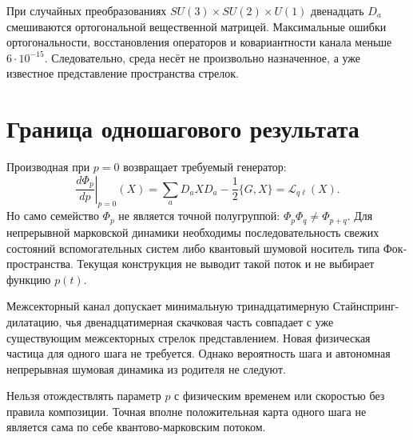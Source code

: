 При случайных преобразованиях $SU(3)\times SU(2)\times U(1)$ двенадцать
$D_a$ смешиваются ортогональной вещественной матрицей. Максимальные ошибки
ортогональности, восстановления операторов и ковариантности канала меньше
$6\cdot10^{-15}$. Следовательно, среда несёт не произвольно назначенное, а
уже известное представление пространства стрелок.

\section{Граница одношагового результата}

Производная при $p=0$ возвращает требуемый генератор:
\begin{equation}
 \left.\frac{d\Phi_p}{dp}\right|_{p=0}(X)
 =\sum_aD_aXD_a-\frac12\{G,X\}
 =\mathcal L_{q\ell}(X).
 \label{eq:v8-channel-generator-derivative}
\end{equation}
Но само семейство $\Phi_p$ не является точной полугруппой:
$\Phi_p\Phi_q\neq\Phi_{p+q}$. Для непрерывной марковской динамики
необходимы последовательность свежих состояний вспомогательных систем либо квантовый
шумовой носитель типа Фок-пространства. Текущая конструкция не выводит
такой поток и не выбирает функцию $p(t)$.

\begin{theorem}
Межсекторный канал допускает минимальную тринадцатимерную Стайнспринг-
дилатацию, чья двенадцатимерная скачковая часть совпадает с уже существующим
межсекторных стрелок представлением. Новая физическая частица для одного шага не
требуется. Однако вероятность шага и автономная непрерывная шумовая
динамика из родителя не следуют.
\end{theorem}

\begin{nogocriterion}
Нельзя отождествлять параметр $p$ с физическим временем или скоростью без
правила композиции. Точная вполне положительная карта одного шага не
является сама по себе квантово-марковским потоком.
\end{nogocriterion}

